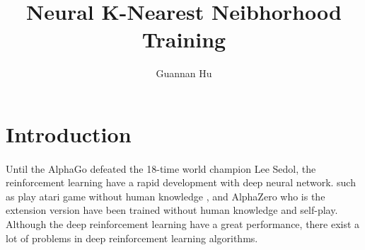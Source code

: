 \documentclass[12pt,a4paper]{article}
\begin{document}
\title{Neural K-Nearest Neibhorhood Training}
\author{Guannan Hu}
\maketitle
\fi
\section{Introduction}
\paragraph{} Until the AlphaGo defeated the 18-time world champion Lee Sedol, the reinforcement learning have a rapid development with deep neural network. such as play atari game without human knowledge \cite{Mnih2013Playing},  and AlphaZero \cite{silver2017mastering} who is the extension version have been trained without human knowledge and self-play. Although the deep reinforcement learning have a great performance, there exist a lot of problems in deep reinforcement learning algorithms.
\end{document}
